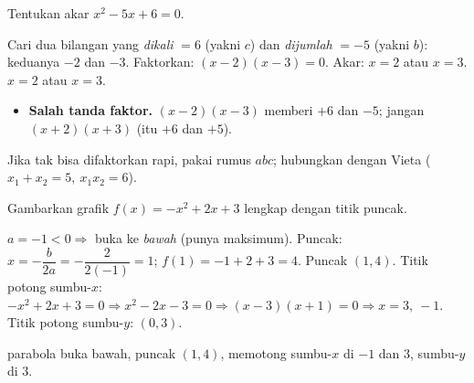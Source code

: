 \begin{soalbox}{}
Tentukan akar $x^2-5x+6=0$.
\end{soalbox}

\jawab
{} Cari dua bilangan yang \emph{dikali} $=6$ (yakni $c$) dan
\emph{dijumlah} $=-5$ (yakni $b$): keduanya $-2$ dan $-3$.
 Faktorkan: $(x-2)(x-3)=0$.
 Akar: $x=2$ atau $x=3$.
\jadi $x=2$ atau $x=3$.

\begin{jebakan}
\begin{itemize}[leftmargin=*,topsep=2pt]
  \item \textbf{Salah tanda faktor.} $(x-2)(x-3)$ memberi $+6$ dan $-5$; jangan
  $(x+2)(x+3)$ (itu $+6$ dan $+5$).
\end{itemize}
\end{jebakan}

\begin{variasi}
Jika tak bisa difaktorkan rapi, pakai rumus $abc$; hubungkan dengan Vieta
($x_1+x_2=5,\ x_1x_2=6$).
\end{variasi}

\begin{soalbox}{}
Gambarkan grafik $f(x)=-x^2+2x+3$ lengkap dengan titik puncak.
\end{soalbox}

\jawab
{} $a=-1<0\Rightarrow$ buka ke \emph{bawah} (punya maksimum).
 Puncak: $x=-\dfrac{b}{2a}=-\dfrac{2}{2(-1)}=1$; $f(1)=-1+2+3=4$.
Puncak $(1,4)$.
 Titik potong sumbu-$x$: $-x^2+2x+3=0\Rightarrow x^2-2x-3=0\Rightarrow
(x-3)(x+1)=0\Rightarrow x=3,\ -1$.
 Titik potong sumbu-$y$: $(0,3)$.

\begin{center}
\end{center}
\jadi parabola buka bawah, puncak $(1,4)$, memotong sumbu-$x$ di $-1$ dan $3$,
sumbu-$y$ di $3$.

